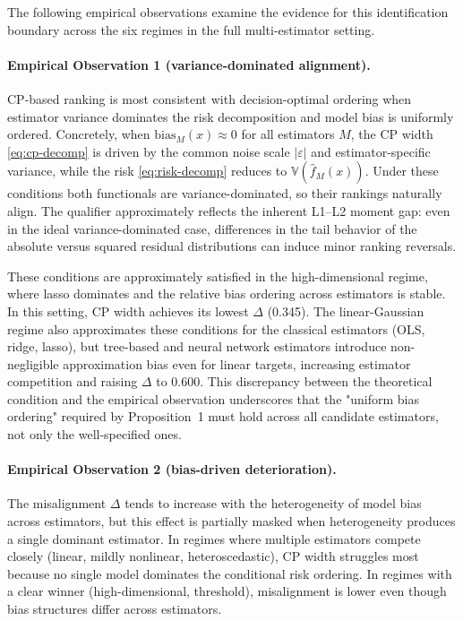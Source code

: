 \documentclass[a4paper,11pt]{article}
\begin{document}
The following empirical observations examine the evidence for this identification boundary across the six regimes in the full multi-estimator setting.

\paragraph{Empirical Observation 1 (variance-dominated alignment).} CP-based ranking is most consistent with decision-optimal ordering when estimator variance dominates the risk decomposition and model bias is uniformly ordered. Concretely, when $\text{bias}_M(x) \approx 0$ for all estimators $M$, the CP width \eqref{eq:cp-decomp} is driven by the common noise scale $|\varepsilon|$ and estimator-specific variance, while the risk \eqref{eq:risk-decomp} reduces to $\mathbb{V}(\hat{f}_M(x))$. Under these conditions both functionals are variance-dominated, so their rankings naturally align. The qualifier approximately reflects the inherent L1--L2 moment gap: even in the ideal variance-dominated case, differences in the tail behavior of the absolute versus squared residual distributions can induce minor ranking reversals.

These conditions are approximately satisfied in the high-dimensional regime, where lasso dominates and the relative bias ordering across estimators is stable. In this setting, CP width achieves its lowest $\Delta$ (0.345). The linear-Gaussian regime also approximates these conditions for the classical estimators (OLS, ridge, lasso), but tree-based and neural network estimators introduce non-negligible approximation bias even for linear targets, increasing estimator competition and raising $\Delta$ to 0.600. This discrepancy between the theoretical condition and the empirical observation underscores that the "uniform bias ordering" required by Proposition~1 must hold across all candidate estimators, not only the well-specified ones.

\paragraph{Empirical Observation 2 (bias-driven deterioration).} The misalignment $\Delta$ tends to increase with the heterogeneity of model bias across estimators, but this effect is partially masked when heterogeneity produces a single dominant estimator. In regimes where multiple estimators compete closely (linear, mildly nonlinear, heteroscedastic), CP width struggles most because no single model dominates the conditional risk ordering. In regimes with a clear winner (high-dimensional, threshold), misalignment is lower even though bias structures differ across estimators.
\end{document}
